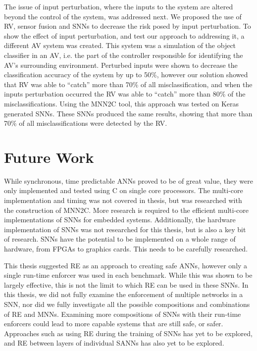 The issue of input perturbation, where the inputs to the system are altered beyond the control of the system, was addressed next.
We proposed the use of \acf{RV}, sensor fusion and \acp{SNN} to decrease the risk posed by input perturbation.
To show the effect of input perturbation, and test our approach to addressing it, a different \ac{AV} system was created. 
This system was a simulation of the object classifier in an \ac{AV}, i.e. the part of the controller responsible for identifying the \ac{AV}'s surrounding environment.
Perturbed inputs were shown to decrease the classification accuracy of the system by up to 50\%, however our solution showed that \ac{RV} was able to ``catch'' more than 70\% of all misclassification, and when the inputs perturbation occurred the \ac{RV} was able to ``catch'' more than 80\% of the misclassifications.
Using the \ac{MNN2C} tool, this approach was tested on Keras generated \acp{SNN}.
These \acp{SNN} produced the same results, showing that more than 70\% of all misclassifications were detected by the \ac{RV}.

\section{Future Work}

While synchronous, time predictable \acp{ANN} proved to be of great value, they were only implemented and tested using C on single core processors.
The multi-core implementation and timing was not covered in thesis, but was researched with the construction of \ac{MNN2C}.
More research is required to the efficient multi-core implementations of \acp{SNN} for embedded systems.
Additionally, the hardware implementation of \acp{SNN} was not researched for this thesis, but is also a key bit of research.
\acp{SNN} have the potential to be implemented on a whole range of hardware, from \acfp{FPGA} to graphics cards.
This needs to be carefully researched. 

This thesis suggested \ac{RE} as an approach to creating safe \acp{ANN}, however only a single run-time enforcer was used in each benchmark.
While this was shown to be largely effective, this is not the limit to which \ac{RE} can be used in these \acp{SNN}.
In this thesis, we did not fully examine the enforcement of multiple networks in a \ac{SNN}, nor did we fully investigate all the possible compositions and combinations of \ac{RE} and \acp{MNN}.
Examining more compositions of \acp{SNN} with their run-time enforcers could lead to more capable systems that are still safe, or safer. 
Approaches such as using \ac{RE} during the training of \acp{SNN} has yet to be explored, and \ac{RE} between layers of individual \acp{SANN} has also yet to be explored.


